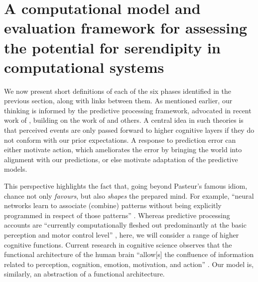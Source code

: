 \section{A computational model and evaluation framework for assessing the potential for serendipity in computational systems} \label{sec:our-model}


We now present short definitions of each of the six phases identified
in the previous section, along with links between them.  As mentioned
earlier, our thinking is informed by the predictive processing
framework, advocated in recent work of \citet{clark2013whatever},
building on the work of \citet{friston2009free} and others.  A central
idea in such theories is that perceived events are only passed forward
to higher cognitive layers if they do not conform with our prior
expectations.  A response to prediction error can either motivate
action, which ameliorates the error by bringing the world into
alignment with our predictions, or else motivate adaptation of the
predictive models.

This perspective highlights the fact that, going beyond Pasteur's
famous idiom, chance not only \emph{favours}, but also \emph{shapes}
the prepared mind.  For example, ``neural networks learn to associate
(combine) patterns without being explicitly programmed in respect of
those patterns'' \cite[p.~137]{boden}.  Whereas predictive processing
accounts are ``currently computationally fleshed out predominantly at
the basic perception and motor control level'' \cite{KWISTHOUT201784},
here, we will consider a range of higher cognitive functions.  Current
research in cognitive science observes that the functional
architecture of the human brain ``allow[s] the confluence of
information related to perception, cognition, emotion, motivation, and
action'' \cite[p.~357]{Pessoa2017}.  Our model is, similarly, an
abstraction of a functional architecture.




